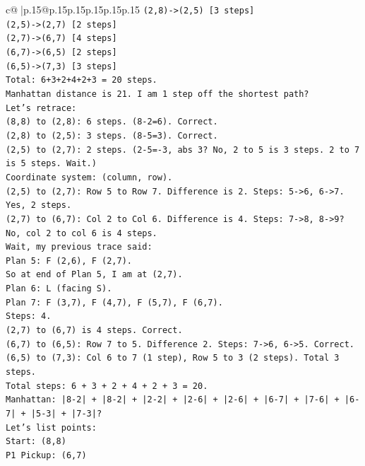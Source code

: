\documentclass{article}
\begin{document}
{\begin{supertabular}{c@{$\;$}|p{.15\linewidth}@{}p{.15\linewidth}p{.15\linewidth}p{.15\linewidth}p{.15\linewidth}p{.15\linewidth}}
{{{\texttt{(2,8){-}>(2,5) {[}3 steps{]}} \\
\texttt{(2,5){-}>(2,7) {[}2 steps{]}} \\
\texttt{(2,7){-}>(6,7) {[}4 steps{]}} \\
\texttt{(6,7){-}>(6,5) {[}2 steps{]}} \\
\texttt{(6,5){-}>(7,3) {[}3 steps{]}} \\
\texttt{Total: 6+3+2+4+2+3 = 20 steps.} \\
\texttt{Manhattan distance is 21. I am 1 step off the shortest path?} \\
\texttt{Let's retrace:} \\
\texttt{(8,8) to (2,8): 6 steps. (8{-}2=6). Correct.} \\
\texttt{(2,8) to (2,5): 3 steps. (8{-}5=3). Correct.} \\
\texttt{(2,5) to (2,7): 2 steps. (2{-}5={-}3, abs 3? No, 2 to 5 is 3 steps. 2 to 7 is 5 steps. Wait.)} \\
\texttt{Coordinate system: (column, row).} \\
\texttt{(2,5) to (2,7): Row 5 to Row 7. Difference is 2. Steps: 5{-}>6, 6{-}>7. Yes, 2 steps.} \\
\texttt{(2,7) to (6,7): Col 2 to Col 6. Difference is 4. Steps: 7{-}>8, 8{-}>9? No, col 2 to col 6 is 4 steps.} \\
\texttt{Wait, my previous trace said:} \\
\texttt{Plan 5: F (2,6), F (2,7).} \\
\texttt{So at end of Plan 5, I am at (2,7).} \\
\texttt{Plan 6: L (facing S).} \\
\texttt{Plan 7: F (3,7), F (4,7), F (5,7), F (6,7).} \\
\texttt{Steps: 4.} \\
\texttt{(2,7) to (6,7) is 4 steps. Correct.} \\
\texttt{(6,7) to (6,5): Row 7 to 5. Difference 2. Steps: 7{-}>6, 6{-}>5. Correct.} \\
\texttt{(6,5) to (7,3): Col 6 to 7 (1 step), Row 5 to 3 (2 steps). Total 3 steps.} \\
\texttt{Total steps: 6 + 3 + 2 + 4 + 2 + 3 = 20.} \\
\texttt{Manhattan: |8{-}2| + |8{-}2| + |2{-}2| + |2{-}6| + |2{-}6| + |6{-}7| + |7{-}6| + |6{-}7| + |5{-}3| + |7{-}3|?} \\
\texttt{Let's list points:} \\
\texttt{Start: (8,8)} \\
\texttt{P1 Pickup: (6,7)} \\
}}}
\end{supertabular}}
\end{document}
